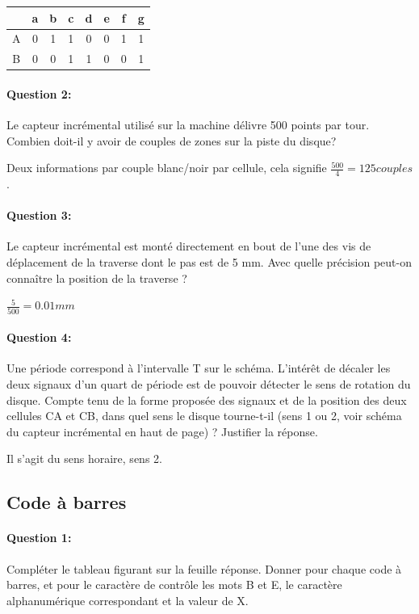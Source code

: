 \begin{center}
\begin{tabular}{|c|c|c|c|c|c|c|c|}
\hline
  & a & b & c & d & e & f & g \\
\hline
A & 0 & 1 & 1 & 0 & 0 & 1 & 1 \\
\hline
B & 0 & 0 & 1 & 1 & 0 & 0 & 1 \\
\hline
\end{tabular}
\end{center}

\paragraph{Question 2:} Le capteur incrémental utilisé sur la machine délivre 500 points par tour. Combien doit-il y avoir de couples de zones sur la piste du disque?

Deux informations par couple blanc/noir par cellule, cela signifie $\frac{500}{4}=125 couples$.

\paragraph{Question 3:} Le capteur incrémental est monté directement en bout de l'une des vis de déplacement de la traverse dont le pas est de 5 mm. Avec quelle précision peut-on connaître la position de la traverse ?

$\frac{5}{500}=0.01mm$

\paragraph{Question 4:} Une période correspond à l'intervalle T sur le schéma. L'intérêt de décaler les deux signaux d'un quart de période est de pouvoir détecter le sens de rotation du disque. Compte tenu de la forme proposée des signaux et de la position des deux cellules CA et CB, dans quel sens le disque tourne-t-il (sens 1 ou 2, voir schéma du capteur incrémental en haut de page) ? Justifier la réponse. 

Il s'agit du sens horaire, sens 2.

\subsection{Code à barres}

\paragraph{Question 1:} Compléter le tableau figurant sur la feuille réponse. Donner pour chaque code à barres, et pour le caractère de contrôle les mots B et E, le caractère alphanumérique correspondant et la valeur de X. 


